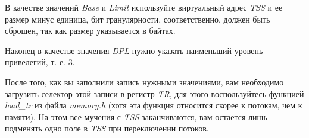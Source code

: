 В качестве значений \emph{Base} и \emph{Limit} используйте виртуальный адрес
\emph{TSS} и ее размер минус единица, бит гранулярности, соответственно, должен
быть сброшен, так как размер указывается в байтах.

Наконец в качестве значения \emph{DPL} нужно указать наименьший уровень привелегий,
т. е. 3.

После того, как вы заполнили запись нужными значениями, вам необходимо загрузить
селектор этой записи в регистр \emph{TR}, для этого воспользуйтесь функцией
\emph{load\_tr} из файла \emph{memory.h} (хотя эта функция относится скорее к
потокам, чем к памяти). На этом все мучения с \emph{TSS} заканчиваются, вам остается
лишь подменять одно поле в \emph{TSS} при переключении потоков.
